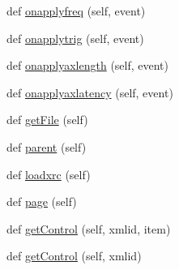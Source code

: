 \begin{DoxyCompactItemize}
def \hyperlink{classProtoFEB__v1_1_1ProtoFEB__v1_ac654ad0cdb32adcdb9a649ead2473739}{onapplyfreq} (self, event)
\item 
def \hyperlink{classProtoFEB__v1_1_1ProtoFEB__v1_a5108ef129a2d3cf2415489db2b8ca0ed}{onapplytrig} (self, event)
\item 
def \hyperlink{classProtoFEB__v1_1_1ProtoFEB__v1_a3f04a3f93366082ad95de91d1457fdf5}{onapplyaxlength} (self, event)
\item 
def \hyperlink{classProtoFEB__v1_1_1ProtoFEB__v1_a99efa326b380d20b35277081583d7e1f}{onapplyaxlatency} (self, event)
\item 
def \hyperlink{classProtoFEB__v1_1_1ProtoFEB__v1_a1c733a344ce1755bbffeec01dc3c9846}{get\+File} (self)
\item 
def \hyperlink{classelement_1_1element_a2705e2b608db596bedf2a206bda42d12}{parent} (self)
\item 
def \hyperlink{classelement_1_1element_aa9fadd76b299e1dfddd1da112dfe8245}{loadxrc} (self)
\item 
def \hyperlink{classelement_1_1element_a80c5e09b291c255b740787b87760fca0}{page} (self)
\item 
def \hyperlink{classobject_1_1object_a54a55487254a96ed2fe367439c41391f}{get\+Control} (self, xmlid, item)
\item 
def \hyperlink{classobject_1_1object_a22a9d1ff67cd6e990cf1b63ed49c50e4}{get\+Control} (self, xmlid)
\end{DoxyCompactItemize}

